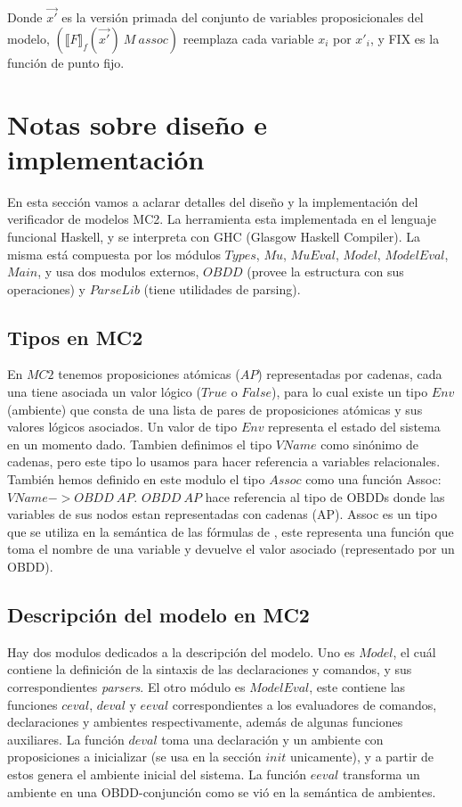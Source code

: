 Donde $\vec {x'}$ es la versión primada del conjunto de variables proposicionales del modelo, $(\llbracket F \rrbracket _{f}(\vec {x'})\ M\ assoc)$ reemplaza cada variable $x_{i}$ por $x'_{i}$, y FIX es la función de punto fijo.

\section{Notas sobre diseño e implementación}

En esta sección vamos a aclarar detalles del diseño y la implementación del verificador de modelos MC2. La herramienta esta implementada en el lenguaje funcional Haskell, y se interpreta con GHC (Glasgow Haskell Compiler). La misma está compuesta por los módulos $Types$, $Mu$, $MuEval$, $Model$, $ModelEval$, $Main$, y usa dos modulos externos, $OBDD$ \cite{Waldmann:6} (provee la estructura con sus operaciones) y $ParseLib$ \cite{Hutton:10} (tiene utilidades de parsing).

\subsection{Tipos en MC2}

En $MC2$ tenemos proposiciones atómicas ($AP$) representadas por cadenas, cada una tiene asociada un valor lógico ($True$ o $False$), para lo cual existe un tipo $Env$ (ambiente) que consta de una lista de pares de proposiciones atómicas y sus valores lógicos asociados. Un valor de tipo $Env$ representa el estado del sistema en un momento dado. Tambien definimos el tipo $VName$ como sinónimo de cadenas, pero este tipo lo usamos para hacer referencia a variables relacionales. También hemos definido en este modulo el tipo $Assoc$ como una función Assoc: $VName -> OBDD\ AP$. $OBDD\ AP$ hace referencia al tipo de OBDDs donde las variables de sus nodos estan representadas con cadenas (AP). Assoc es un tipo que se utiliza en la semántica de las fórmulas de {\mucalculo}, este representa una función que toma el nombre de una variable y devuelve el valor asociado (representado por un OBDD).

\subsection{Descripción del modelo en MC2}

Hay dos modulos dedicados a la descripción del modelo. Uno es $Model$, el cuál contiene la definición de la sintaxis de las declaraciones y comandos, y  sus correspondientes \textit{parsers}. El otro módulo es $ModelEval$, este contiene las funciones $ceval$, $deval$ y $eeval$ correspondientes a los evaluadores de comandos, declaraciones y ambientes respectivamente, además de algunas funciones auxiliares. La función $deval$ toma una declaración y un ambiente con proposiciones a inicializar (se usa en la sección $init$ unicamente), y a partir de estos genera el ambiente inicial del sistema. La función $eeval$ transforma un ambiente en una OBDD-conjunción como se vió en la semántica de ambientes.

